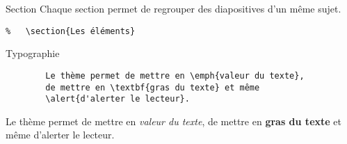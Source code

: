 \documentclass[]{beamer}
\begin{document}
\begin{frame}[fragile]{Section}
	Chaque section permet de regrouper des diapositives d'un même sujet.
	\begin{verbatim}
% 	\section{Les éléments}
	\end{verbatim}
 \end{frame}

 \begin{frame}[fragile]{Typographie}
 	\begin{verbatim}
		Le thème permet de mettre en \emph{valeur du texte},
		de mettre en \textbf{gras du texte} et même
		\alert{d'alerter le lecteur}.
 	\end{verbatim}
 	Le thème permet de mettre en \emph{valeur du texte}, de mettre en \textbf{gras du texte} et même \alert{d'alerter le lecteur}.
 \end{frame}
%
\end{document}
